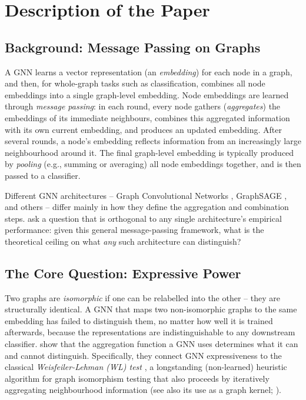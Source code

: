 \documentclass[11pt]{article}
\begin{document}
\section{Description of the Paper}
\label{sec:description}

\subsection{Background: Message Passing on Graphs}
A GNN learns a vector representation (an \emph{embedding}) for each node in a graph, and then, for whole-graph tasks such as classification, combines all node embeddings into a single graph-level embedding. Node embeddings are learned through \emph{message passing}: in each round, every node gathers (\emph{aggregates}) the embeddings of its immediate neighbours, combines this aggregated information with its own current embedding, and produces an updated embedding. After several rounds, a node's embedding reflects information from an increasingly large neighbourhood around it. The final graph-level embedding is typically produced by \emph{pooling} (e.g., summing or averaging) all node embeddings together, and is then passed to a classifier.

Different GNN architectures -- Graph Convolutional Networks \citep[GCN;][]{kipf2017gcn}, GraphSAGE \citep{hamilton2017graphsage}, and others -- differ mainly in how they define the aggregation and combination steps. \citet{xu2019gin} ask a question that is orthogonal to any single architecture's empirical performance: given this general message-passing framework, what is the theoretical ceiling on what \emph{any} such architecture can distinguish?

\subsection{The Core Question: Expressive Power}
Two graphs are \emph{isomorphic} if one can be relabelled into the other -- they are structurally identical. A GNN that maps two non-isomorphic graphs to the same embedding has failed to distinguish them, no matter how well it is trained afterwards, because the representations are indistinguishable to any downstream classifier. \citet{xu2019gin} show that the aggregation function a GNN uses determines what it can and cannot distinguish. Specifically, they connect GNN expressiveness to the classical \emph{Weisfeiler-Lehman (WL) test} \citep{weisfeiler1968reduction}, a longstanding (non-learned) heuristic algorithm for graph isomorphism testing that also proceeds by iteratively aggregating neighbourhood information (see also its use as a graph kernel; \citealp{shervashidze2011wlkernel}).
\end{document}
